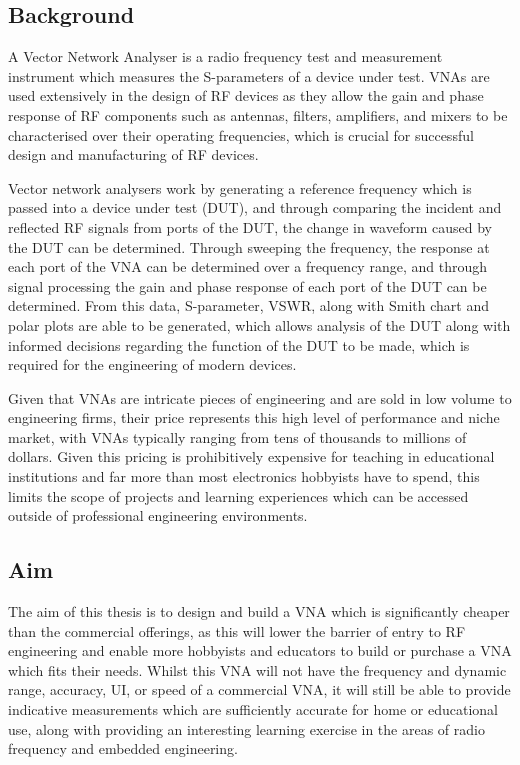 \subsection{Background}
A Vector Network Analyser is a radio frequency test and measurement instrument which measures the S-parameters of a device under test. VNAs are used extensively in the design of RF devices as they allow the gain and phase response of RF components such as antennas, filters, amplifiers, and mixers to be characterised over their operating frequencies, which is crucial for successful design and manufacturing of RF devices.

Vector network analysers work by generating a reference frequency which is passed into a device under test (DUT), and through comparing the incident and reflected RF signals from ports of the DUT, the change in waveform caused by the DUT can be determined. Through sweeping the frequency, the response at each port of the VNA can be determined over a frequency range, and through signal processing the gain and phase response of each port of the DUT can be determined. From this data, S-parameter, VSWR, along with Smith chart and polar plots are able to be generated, which allows analysis of the DUT along with informed decisions regarding the function of the DUT to be made, which is required for the engineering of modern devices. 

Given that VNAs are intricate pieces of engineering and are sold in low volume to engineering firms, their price represents this high level of performance and niche market, with VNAs typically ranging from tens of thousands to millions of dollars. Given this pricing is prohibitively expensive for teaching in educational institutions and far more than most electronics hobbyists have to spend, this limits the scope of projects and learning experiences which can be accessed outside of professional engineering environments. 

\subsection{Aim}
The aim of this thesis is to design and build a VNA which is significantly cheaper than the commercial offerings, as this will lower the barrier of entry to RF engineering and enable more hobbyists and educators to build or purchase a VNA which fits their needs. Whilst this VNA will not have the frequency and dynamic range, accuracy, UI, or speed of a commercial VNA, it will still be able to provide indicative measurements which are sufficiently accurate for home or educational use, along with providing an interesting learning exercise in the areas of radio frequency and embedded engineering.  

